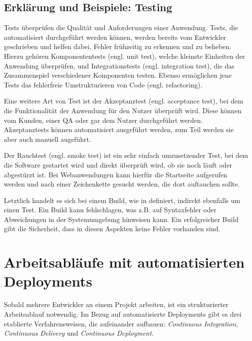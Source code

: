 \subsection{Erklärung und Beispiele: Testing}
\label{subsec:def-testing}

Tests überprüfen die Qualität und Anforderungen einer Anwendung. Tests, die automatisiert durchgeführt werden können, werden bereits vom Entwickler geschrieben und helfen dabei, Fehler frühzeitig zu erkennen und zu beheben. Hierzu gehören Komponententests (engl. unit test), welche kleinste Einheiten der Anwendung überprüfen, und Integrationstests (engl. integration test), die das Zusammenspiel verschiedener Komponenten testen. Ebenso ermöglichen jene Tests das fehlerfreie Umstrukturieren von Code (engl. refactoring). \citep[104f]{Wolff2016}

Eine weitere Art von Test ist der Akzeptanztest (engl. acceptance test), bei dem die Funktionalität der Anwendung für den Nutzer überprüft wird. Diese können vom Kunden, einer \ac{QA} oder gar dem Nutzer durchgeführt werden. Akzeptanztests können automatisiert ausgeführt werden, zum Teil werden sie aber auch manuell augeführt. \citep[86]{Humble2010}

Der Rauchtest (engl. smoke test) ist ein sehr einfach umzusetzender Test, bei dem die Software gestartet wird und direkt überprüft wird, ob sie noch läuft oder abgestürzt ist. Bei Webanwendungen kann hierfür die Startseite aufgerufen werden und nach einer Zeichenkette gesucht werden, die dort auftauchen sollte. \citep[117]{Humble2010}

Letztlich handelt es sich bei einem Build, wie in  definiert, indirekt ebenfalls um einen Test. Ein Build kann fehlschlagen, was z.B. auf Syntaxfehler oder Abweichungen in der Systemumgebung hinweisen kann. Ein erfolgreicher Build gibt die Sicherheit, dass in diesen Aspekten keine Fehler vorhanden sind.

\section{Arbeitsabläufe mit automatisierten Deployments}

Sobald mehrere Entwickler an einem Projekt arbeiten, ist ein strukturierter Arbeitsablauf notwendig. Im Bezug auf automatisierte Deployments gibt es drei etablierte Verfahrensweisen, die aufeinander aufbauen: \emph{Continuous Integration}, \emph{Continuous Delivery} und \emph{Continuous Deployment}.

